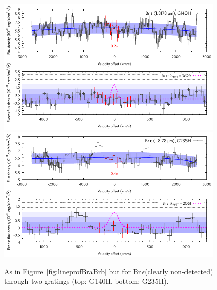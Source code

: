 \documentclass[twocolumn,twocolumnappendix]{aastex631}
\def\Bre{\ensuremath{\mathrm{Br}\,\epsilon}\xspace}         %
\begin{document}
\begin{figure}
 \centering
 \includegraphics[width=0.97\textwidth]{TWA27b_g140h-f100lp_rood_sigkorr_Bre_Dv2700_ohni300_Abb_simul.pdf}
 \includegraphics[width=0.97\textwidth]{TWA27b_g235h-f170lp_blauw_sigkorr_Bre_Dv2700_ohni300_Abb_simul.pdf}
\caption{%
As in Figure~\ref{fig:lineprofBraBrb} but for \Bre (clearly non-detected) through two gratings (top: G140H, bottom: G235H).
}
\label{fig:lineprofBre2}
\end{figure}
\end{document}
